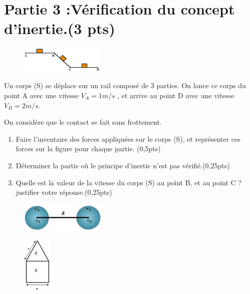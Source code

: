 \documentclass[12pt]{article}
\begin{document}
 \section*{Partie 3 :Vérification du concept d'inertie.\dotfill(3 pts)}


\begin{figure}
	\includegraphics[width=0.36\textwidth]{./img/last.png}
\end{figure}


Un corps (S) se déplace sur un rail composé de 3 parties. On
lance ce corps du point A avec une vitesse $V_A=1m/s$ , et arrive au point D avec une vitesse $V_D=2m/s$. 

On considère que le contact se fait sans frottement.

\begin{enumerate}
	\item Faire l’inventaire des forces appliquées sur le corps (S), et représenter ces forces sur la figure pour
chaque partie. \dotfill(0,5pts)
\item Déterminer la partie où le principe d’inertie n’est pas vérifié.\dotfill(0,25pts)
\item Quelle est la valeur de la vitesse du corps (S) au point B, et au point C ? justifier votre réponse.\dotfill(0,25pts)
\end{enumerate}


\begin{figure}
	\vspace{-0.8cm}
	\includegraphics[width=0.36\textwidth]{./img/ex3.png}
\end{figure}

\begin{figure}
	\vspace{-3cm}
\includegraphics[width=0.12\textwidth]{./img/ex4.png}
\end{figure}
\end{document}
